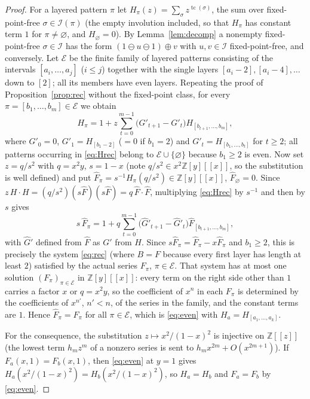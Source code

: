 \documentclass[11pt]{amsart}
\theoremstyle{definition}
\DeclareMathOperator{\tc}{tc}
\newcommand{\I}{\mathcal{I}}
\newcommand{\Z}{\mathbb{Z}}
\newcommand{\ds}{\oplus}
\newcommand{\sk}{\ominus}
\begin{document}
\begin{proof}
For a layered pattern $\pi$ let $H_\pi(z)=\sum_\sigma z^{\tc(\sigma)}$, the sum over fixed-point-free $\sigma\in\I(\pi)$ (the empty involution included, so that $H_\pi$ has constant term $1$ for $\pi\ne\varnothing$, and $H_\varnothing=0$). By Lemma~\ref{lem:decomp} a nonempty fixed-point-free $\sigma\in\I$ has the form $(1\sk u\sk1)\ds v$ with $u,v\in\I$ fixed-point-free, and conversely. Let $\mathcal E$ be the finite family of layered patterns consisting of the intervals $[a_i,\dots,a_j]$ ($i\le j$) together with the single layers $[a_i-2],[a_i-4],\dots$ down to $[2]$; all its members have even layers. Repeating the proof of Proposition~\ref{prop:rec} without the fixed-point class, for every $\pi=[b_1,\dots,b_m]\in\mathcal E$ we obtain
\begin{equation}\label{eq:Hrec}
H_{\pi}=1+z\sum_{t=0}^{m-1}\bigl(G'_{t+1}-G'_t\bigr)H_{[b_{t+1},\dots,b_m]},
\end{equation}
where $G'_0=0$, $G'_1=H_{[b_1-2]}$ ($=0$ if $b_1=2$) and $G'_t=H_{[b_1,\dots,b_t]}$ for $t\ge2$; all patterns occurring in \eqref{eq:Hrec} belong to $\mathcal E\cup\{\varnothing\}$ because $b_1\ge2$ is even. Now set $z=q/s^2$ with $q=x^2y$, $s=1-x$ (note $q/s^2\in x^2\Z[y][[x]]$, so the substitution is well defined) and put $\widehat F_\pi=s^{-1}H_\pi(q/s^2)\in\Z[y][[x]]$, $\widehat F_\varnothing=0$. Since $z\,H\cdot H=(q/s^2)(s\widehat F)(s\widehat F)=q\,\widehat F\cdot\widehat F$, multiplying \eqref{eq:Hrec} by $s^{-1}$ and then by $s$ gives
\[
s\,\widehat F_\pi=1+q\sum_{t=0}^{m-1}\bigl(\widehat G'_{t+1}-\widehat G'_t\bigr)\widehat F_{[b_{t+1},\dots,b_m]},
\]
with $\widehat G'$ defined from $\widehat F$ as $G'$ from $H$. Since $s\widehat F_\pi=\widehat F_\pi-x\widehat F_\pi$ and $b_1\ge2$, this is precisely the system \eqref{eq:rec} (where $B=F$ because every first layer has length at least $2$) satisfied by the actual series $F_\pi$, $\pi\in\mathcal E$. That system has at most one solution $(F_\pi)_{\pi\in\mathcal E}$ in $\Z[y][[x]]$: every term on the right side other than $1$ carries a factor $x$ or $q=x^2y$, so the coefficient of $x^n$ in each $F_\pi$ is determined by the coefficients of $x^{n'}$, $n'<n$, of the series in the family, and the constant terms are $1$. Hence $\widehat F_\pi=F_\pi$ for all $\pi\in\mathcal E$, which is \eqref{eq:even} with $H_a=H_{[a_1,\dots,a_k]}$.

For the consequence, the substitution $z\mapsto x^2/(1-x)^2$ is injective on $\Z[[z]]$ (the lowest term $h_mz^m$ of a nonzero series is sent to $h_mx^{2m}+O(x^{2m+1})$). If $F_a(x,1)=F_b(x,1)$, then \eqref{eq:even} at $y=1$ gives $H_a(x^2/(1-x)^2)=H_b(x^2/(1-x)^2)$, so $H_a=H_b$ and $F_a=F_b$ by \eqref{eq:even}.
\end{proof}
\end{document}
